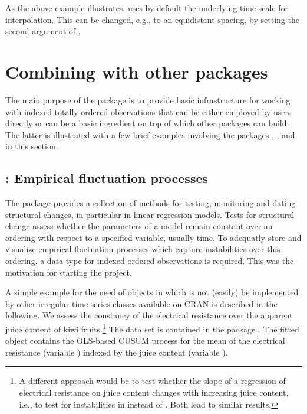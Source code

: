 \documentclass{Z}
\begin{document}
As the above example illustrates,  uses by default
the underlying time scale for interpolation. This can be changed, e.g.,
to an equidistant spacing, by setting the second argument of
.

\section[Combining zoo with other packages]{Combining  with other packages}
\label{sec:combining}

The main purpose of the package  is to provide basic infrastructure for
working with indexed totally ordered observations that can be either employed by
users directly or can be a basic ingredient on top of which other packages can
build. The latter is illustrated with a few brief examples involving the packages
, ,  and  in this section.

\subsection[strucchange: Empirical fluctuation processes]{: Empirical fluctuation processes}
\label{sec:strucchange}

The package  provides a collection of methods for testing,
monitoring and dating structural changes, in particular in linear regression models.
Tests for structural change assess whether the parameters of a model remain
constant over an ordering with respect to a specified variable, usually time.
To adequatly store and visualize empirical fluctuation processes which 
capture instabilities over this ordering, a data type for indexed ordered
observations is required. This was the motivation for starting the 
project.

A simple example for the need of  objects in 
which is not (easily) be implemented by other irregular time series classes
available on CRAN is described in the following. We assess the constancy of the
electrical resistance over the apparent juice content of kiwi fruits.\footnote{A different
approach would be to test whether the slope of a regression of electrical resistance
on juice content changes with increasing juice content, i.e., to test for
instabilities in  instead of . Both lead to 
similar results.} The data
set  is contained in the  package \citep{zoo:DAAG:2004}.
The fitted  object contains the OLS-based CUSUM process for the mean
of the electrical resistance (variable ) indexed by the juice
content (variable ).
\end{document}
